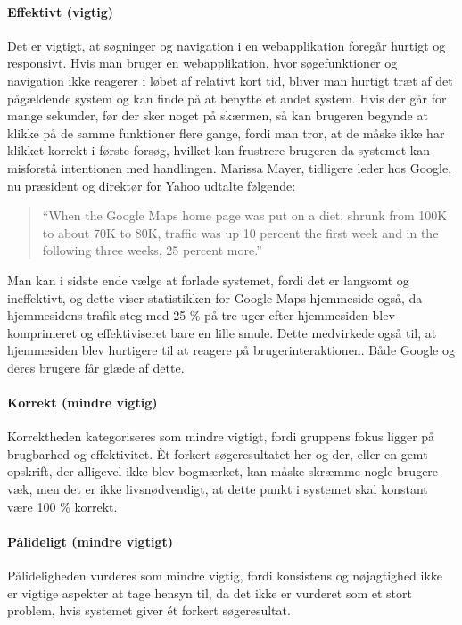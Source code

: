 \paragraph{Effektivt (vigtig)} 
Det er vigtigt, at søgninger og navigation i en webapplikation foregår hurtigt og responsivt. Hvis man bruger en webapplikation, hvor søgefunktioner og navigation ikke reagerer i løbet af relativt kort tid, bliver man hurtigt træt af det pågældende system og kan finde på at benytte et andet system. Hvis der går for mange sekunder, før der sker noget på skærmen, så kan brugeren begynde at klikke på de samme funktioner flere gange, fordi man tror, at de måske ikke har klikket korrekt i første forsøg, hvilket kan frustrere brugeren da systemet kan misforstå intentionen med handlingen. Marissa Mayer, tidligere leder hos Google, nu præsident og direktør for Yahoo udtalte følgende: \cite{googlespeed}

\begin{quote}
``When the Google Maps home page was put on a diet, shrunk from 100K to about 70K to 80K, traffic was up 10 percent the first week and in the following three weeks, 25 percent more.''
\end{quote}  

Man kan i sidste ende vælge at forlade systemet, fordi det er langsomt og ineffektivt, og dette viser statistikken for Google Maps hjemmeside også, da hjemmesidens trafik steg med 25 \% på tre uger efter hjemmesiden blev komprimeret og effektiviseret bare en lille smule. Dette medvirkede også til, at hjemmesiden blev hurtigere til at reagere på brugerinteraktionen. Både Google og deres brugere får glæde af dette.

\paragraph{Korrekt (mindre vigtig)} 
Korrektheden kategoriseres som mindre vigtigt, fordi gruppens fokus ligger på brugbarhed og effektivitet. Èt forkert søgeresultatet her og der, eller en gemt opskrift, der alligevel ikke blev bogmærket, kan måske skræmme nogle brugere væk, men det er ikke livsnødvendigt, at dette punkt i systemet skal konstant være 100 \% korrekt.

\paragraph{Pålideligt (mindre vigtigt)} 
Pålideligheden vurderes som mindre vigtig, fordi konsistens og nøjagtighed ikke er vigtige aspekter at tage hensyn til, da det ikke er vurderet som et stort problem, hvis systemet giver ét forkert søgeresultat.

